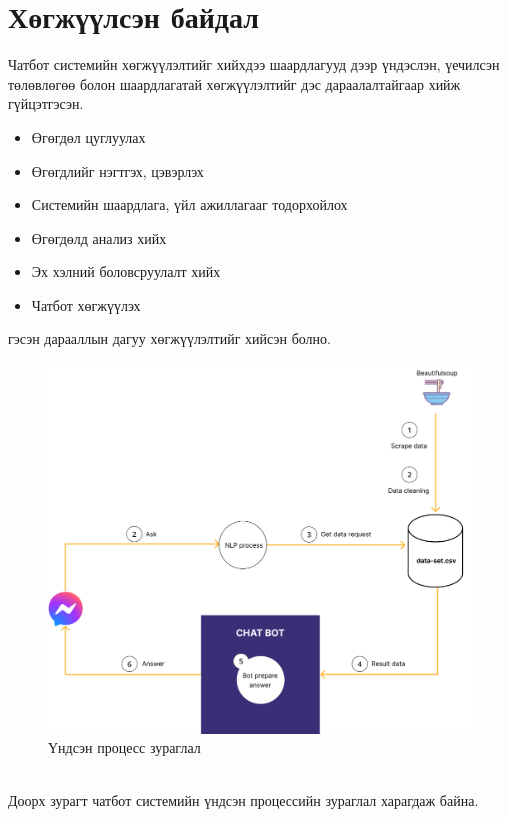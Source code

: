 \section{Хөгжүүлсэн байдал}
Чатбот системийн хөгжүүлэлтийг хийхдээ шаардлагууд дээр үндэслэн, үечилсэн төлөвлөгөө болон шаардлагатай хөгжүүлэлтийг дэс дараалалтайгаар хийж гүйцэтгэсэн.
\begin{itemize}
  \item Өгөгдөл цуглуулах
  \item Өгөгдлийг нэгтгэх, цэвэрлэх
  \item Системийн шаардлага, үйл ажиллагааг тодорхойлох
  \item Өгөгдөлд анализ хийх
  \item Эх хэлний боловсруулалт хийх
  \item Чатбот хөгжүүлэх
\end{itemize}
гэсэн дарааллын дагуу хөгжүүлэлтийг хийсэн болно.
\begin{figure}[ht]
  \centering
  \includegraphics[width = \textwidth]{images/mainProcess.png}
  \caption{Үндсэн процесс зураглал}\label{mainProcess}
\end{figure}
\\Доорх зурагт чатбот системийн үндсэн процессийн зураглал харагдаж байна. 

\newpage
